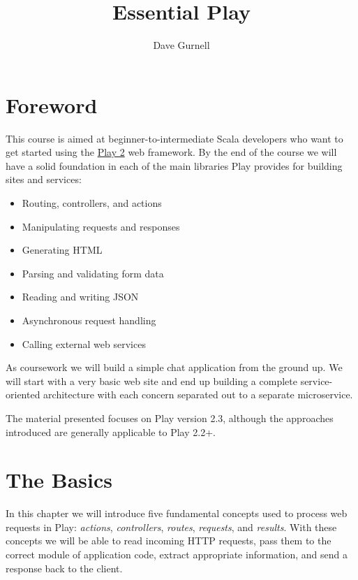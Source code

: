 \documentclass[oneside,11pt,a4paper,]{book}
\title{Essential Play}
\author{Dave Gurnell}
\date{}
\begin{document}
\maketitle

{
\hypersetup{linkcolor=black}
\setcounter{tocdepth}{4}
\tableofcontents
}
\pagebreak

\chapter{Foreword}\label{foreword}

This course is aimed at beginner-to-intermediate Scala developers who
want to get started using the \href{http://playframework.com}{Play 2}
web framework. By the end of the course we will have a solid foundation
in each of the main libraries Play provides for building sites and
services:

\begin{itemize}
\itemsep1pt\parskip0pt
\item
  Routing, controllers, and actions
\item
  Manipulating requests and responses
\item
  Generating HTML
\item
  Parsing and validating form data
\item
  Reading and writing JSON
\item
  Asynchronous request handling
\item
  Calling external web services
\end{itemize}

As coursework we will build a simple chat application from the ground
up. We will start with a very basic web site and end up building a
complete service-oriented architecture with each concern separated out
to a separate microservice.

The material presented focuses on Play version 2.3, although the
approaches introduced are generally applicable to Play 2.2+.

\chapter{The Basics}\label{chapter-basics}

In this chapter we will introduce five fundamental concepts used to
process web requests in Play: \emph{actions}, \emph{controllers},
\emph{routes}, \emph{requests}, and \emph{results}. With these concepts
we will be able to read incoming HTTP requests, pass them to the correct
module of application code, extract appropriate information, and send a
response back to the client.
\end{document}

